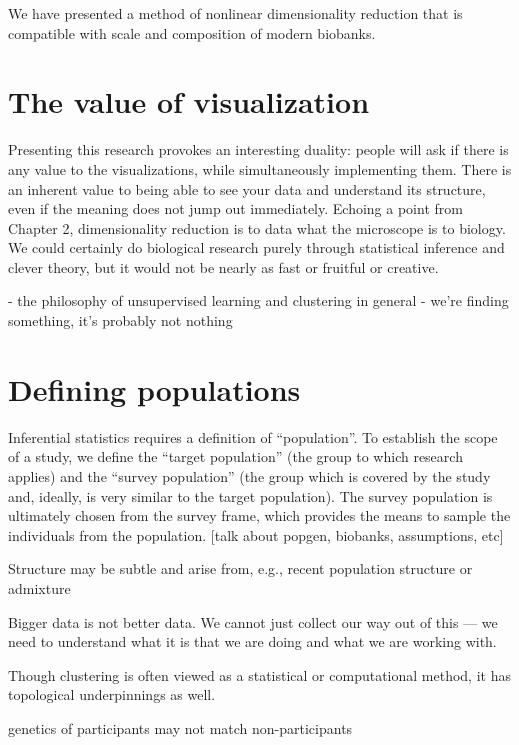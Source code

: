 We have presented a method of nonlinear dimensionality reduction that is compatible with scale and composition of modern biobanks. 

\section{The value of visualization}

Presenting this research provokes an interesting duality: people will ask if there is any value to the visualizations, while simultaneously implementing them. There is an inherent value to being able to see your data and understand its structure, even if the meaning does not jump out immediately. Echoing a point from Chapter 2, dimensionality reduction is to data what the microscope is to biology. We could certainly do biological research purely through statistical inference and clever theory, but it would not be nearly as fast or fruitful or creative.

- the philosophy of unsupervised learning and clustering in general
- we're finding something, it's probably not nothing

\section{Defining populations}

Inferential statistics requires a definition of ``population''\citep{statcan2003}. To establish the scope of a study, we define the ``target population'' (the group to which research applies) and the ``survey population'' (the group which is covered by the study and, ideally, is very similar to the target population). The survey population is ultimately chosen from the survey frame, which provides the means to sample the individuals from the population. [talk about popgen, biobanks, assumptions, etc]


Structure may be subtle and arise from, e.g., recent population structure or admixture\citep{gopalan_human_2022}

Bigger data is not better data. We cannot just collect our way out of this --- we need to understand what it is that we are doing and what we are working with.



Though clustering is often viewed as a statistical or computational method, it has topological underpinnings as well.

genetics of participants may not match non-participants
\citep{benonisdottir_studying_2023}

